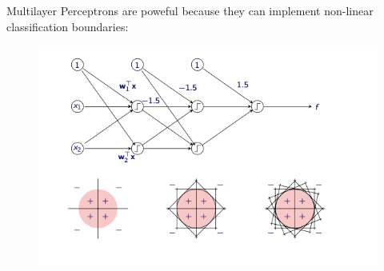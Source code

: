 Multilayer Perceptrons are poweful because they can implement non-linear classification boundaries:
\begin{figure}
    \centering
    \includegraphics[width=0.5\linewidth]{img/MLP-circle.png}
    
    
\end{figure}











